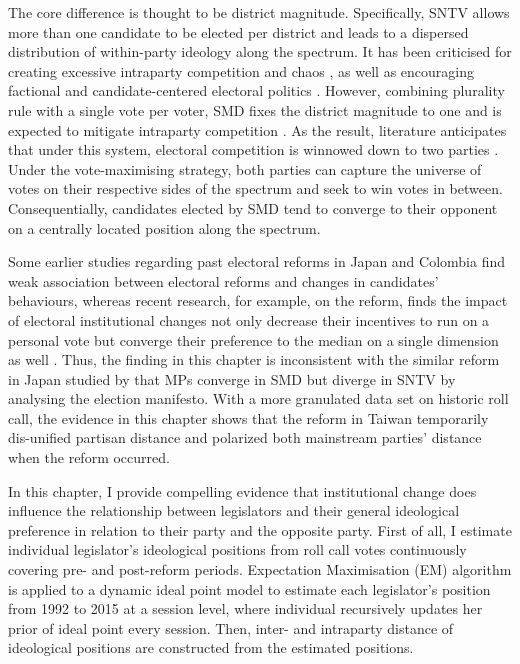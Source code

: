 The core difference is thought to be district magnitude. Specifically, SNTV allows more than one candidate to be elected per district and leads to a dispersed distribution of within-party ideology along the spectrum. It has been criticised for creating excessive intraparty competition and chaos \citep[][]{Cox1990, Hirano2006, Ames1995}, as well as encouraging factional and candidate-centered electoral politics \citep[e.g.][]{Batto2016, Wu2003}. However, combining plurality rule with a single vote per voter, SMD fixes the district magnitude to one and is expected to mitigate intraparty competition \citep[][]{Carey1995, Shugart2003, Andre2014}. As the result, literature anticipates that under this system, electoral competition is winnowed down to two parties \citep[][]{Catalinac2016}. Under the vote-maximising strategy, both parties can capture the universe of votes on their respective sides of the spectrum and seek to win votes in between. Consequentially, candidates elected by SMD tend to converge to their opponent on a centrally located position along the spectrum.

Some earlier studies regarding past electoral reforms in Japan and Colombia \citep[e.g.,][]{Hideo1998, Crisp2002, Christensen1994} find weak association between electoral reforms and changes in candidates' behaviours, whereas recent research, for example, on the reform, finds the impact of electoral institutional changes not only decrease their incentives to run on a personal vote \citep[e.g.,][]{Catalinac2017, Sheng2014a} but converge their preference to the median on a single dimension as well \citep[e.g.,][]{Catalinac2017, Catalinac2016, Sheng2014a}. Thus, the finding in this chapter is inconsistent with the similar reform in Japan studied by \citet{Catalinac2016} that MPs converge in SMD but diverge in SNTV by analysing the election manifesto. With a more granulated data set on historic roll call, the evidence in this chapter shows that the reform in Taiwan temporarily dis-unified partisan distance and polarized both mainstream parties' distance when the reform occurred. 

In this chapter, I provide compelling evidence that institutional change does influence the relationship between legislators and their general ideological preference in relation to their party and the opposite party. First of all, I estimate individual legislator's ideological positions from roll call votes continuously covering pre- and post-reform periods. Expectation Maximisation (EM) algorithm is applied to a dynamic ideal point model to estimate each legislator's position from 1992 to 2015 at a session level, where individual recursively updates her prior of ideal point every session. Then, inter- and intraparty distance of ideological positions are constructed from the estimated positions. 

